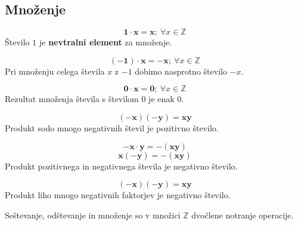          

         
            \subsection{Množenje}

             
                $$\mathbf{1\cdot x=x}; ~\forall x\in\mathbb{Z}$$
                Število $1$ je \textbf{nevtralni element} za množenje.
             

             
                $$\mathbf{(-1)\cdot x=-x}; ~\forall x\in\mathbb{Z}$$
                Pri množenju celega števila $x$ z $-1$ dobimo nasprotno število $-x$.
             

             
                $$\mathbf{0\cdot x=0}; ~\forall x\in\mathbb{Z}$$
                Rezultat množenja števila s številom $0$ je enak $0$.
             

         

         


             
                $$\mathbf{(-x)(-y)=xy}$$
                Produkt sodo mnogo negativnih števil je pozitivno število.
             

             
                $$\mathbf{-x\cdot y=-(xy)}$$
                $$\mathbf{x(-y)=-(xy)}$$
                Produkt pozitivnega in negativnega števila je negativno število.
             

             
                $$\mathbf{(-x)(-y)=xy}$$
                Produkt liho mnogo negativnih faktorjev je negativno število.
                ~\newline

             
                Seštevanje, odštevanje in množenje so v množici $\mathbb{Z}$ dvočlene notranje operacije.
             
         